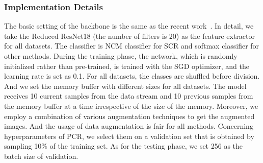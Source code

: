 \subsubsection{Implementation Details}
The basic setting of the backbone is the same as the recent work~\cite{caccia2021new}. In detail, we take the Reduced ResNet18 (the number of filters is 20) as the feature extractor for all datasets. The classifier is NCM classifier for SCR and softmax classifier for other methods. During the training phase, the network, which is randomly initialized rather than pre-trained, is trained with the SGD optimizer, and the learning rate is set as 0.1. 
For all datasets, the classes are shuffled before division. And we set the memory buffer with different sizes for all datasets. The model receives 10 current samples from the data stream and 10 previous samples from the memory buffer at a time irrespective of the size of the memory. Moreover, we employ a combination of various augmentation techniques to get the augmented images. And the usage of data augmentation is fair for all methods.  Concerning hyperparameters of PCR, we select them on a validation set that is obtained by sampling 10\% of the training set. As for the testing phase, we set 256 as the batch size of validation. 





